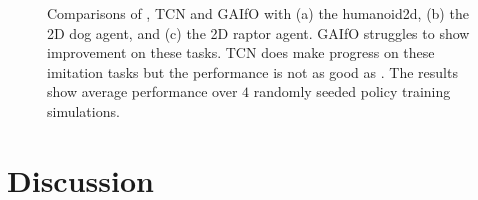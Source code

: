 \documentclass{article}
\begin{document}
\begin{figure}[t!]
\centering
\caption{
Comparisons of \methodName, \ac{TCN} and \ac{GAIfO} with (a) the humanoid2d, (b) the 2D dog agent, and (c) the 2D raptor agent. \ac{GAIfO} struggles to show improvement on these tasks. \ac{TCN} does make progress on these imitation tasks but the performance is not as good as \methodName.
The results show average performance over $4$ randomly seeded policy training simulations.
}
\label{fig:humanoid2d-rl-compare-old-cd}
\vspace{-0.25cm}
\end{figure}


\section{Discussion}
\label{sec:discussion}



 
\clearpage
\appendix
\end{document}
